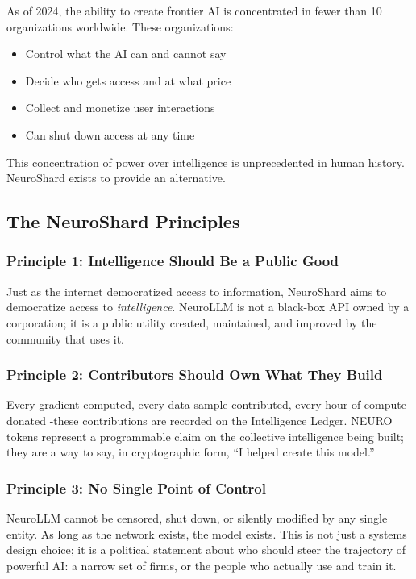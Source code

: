 \documentclass[11pt,a4paper]{article}
\begin{document}
As of 2024, the ability to create frontier AI is concentrated in fewer than 10 organizations worldwide. These organizations:
\begin{itemize}
    \item Control what the AI can and cannot say
    \item Decide who gets access and at what price
    \item Collect and monetize user interactions
    \item Can shut down access at any time
\end{itemize}

This concentration of power over intelligence is unprecedented in human history. NeuroShard exists to provide an alternative.

\subsection{The NeuroShard Principles}

\subsubsection{Principle 1: Intelligence Should Be a Public Good}
Just as the internet democratized access to information, NeuroShard aims to democratize access to \textit{intelligence}. NeuroLLM is not a black-box API owned by a corporation; it is a public utility created, maintained, and improved by the community that uses it.

\subsubsection{Principle 2: Contributors Should Own What They Build}
Every gradient computed, every data sample contributed, every hour of compute donated -these contributions are recorded on the Intelligence Ledger. NEURO tokens represent a programmable claim on the collective intelligence being built; they are a way to say, in cryptographic form, ``I helped create this model.''

\subsubsection{Principle 3: No Single Point of Control}
NeuroLLM cannot be censored, shut down, or silently modified by any single entity. As long as the network exists, the model exists. This is not just a systems design choice; it is a political statement about who should steer the trajectory of powerful AI: a narrow set of firms, or the people who actually use and train it.
\end{document}
